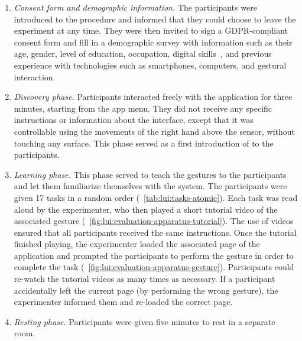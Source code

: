 \begin{enumerate}
    \item \textit{Consent form and demographic information.} The participants were introduced to the procedure and informed that they could choose to leave the experiment at any time. They were then invited to sign a GDPR-compliant consent form and fill in a demographic survey with information such as their age, gender, level of education, occupation, digital skills~\cite{Rose:2012}, and previous experience with technologies such as smartphones, computers, and gestural interaction.
    
    \item \textit{Discovery phase.} Participants interacted freely with the \lui application for three minutes, starting from the app menu. They did not receive any specific instructions or information about the interface, except that it was controllable using the movements of the right hand above the sensor, without touching any surface. This phase served as a first introduction of \lui to the participants.
    
    \item \textit{Learning phase.} This phase served to teach the gestures to the participants and let them familiarize themselves with the system. The participants were given 17 tasks in a random order (\tab~\ref{tab:lui:tasks-atomic}). Each task was read aloud by the experimenter, who then played a short tutorial video of the associated gesture (\fig~\ref{fig:lui:evaluation-apparatus-tutorial}). 
    The use of videos ensured that all participants received the same instructions. Once the tutorial finished playing, the experimenter loaded the associated page of the \lui application and prompted the participants to perform the gesture in order to complete the task (\fig~\ref{fig:lui:evaluation-apparatus-gesture}). Participants could re-watch the tutorial videos as many times as necessary. If a participant accidentally left the current page (\eg by performing the wrong gesture), the experimenter informed them and re-loaded the correct page.  %
    
    \item \textit{Resting phase.} Participants were given five minutes to rest in a separate room.
    

\end{enumerate}
